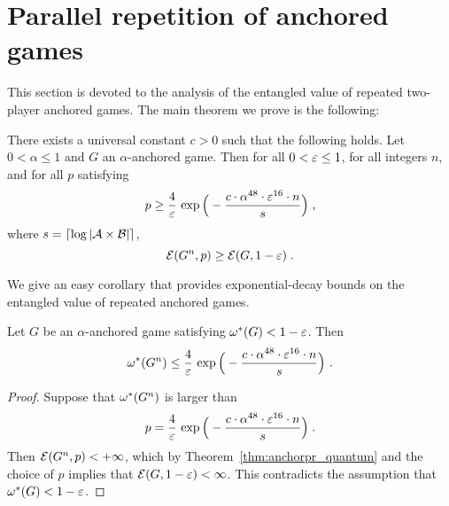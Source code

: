 
\section{Parallel repetition of anchored games}
\label{sec:analysis}

This section is devoted to the analysis of the entangled value of repeated two-player anchored games. The main theorem we prove is the following:


\begin{theorem}\label{thm:anchorpr_quantum}
	There exists a universal constant $c > 0$ such that the following holds. Let $0<\alpha\leq 1$ and $G$ an $\alpha$-anchored game. Then for all $0 < \varepsilon \leq 1$,
for all integers $n$, and for all $p$ satisfying
\begin{equation}
\label{eq:p}
p \geq \frac{4}{\varepsilon} \, \exp \Big ( - \frac{c \cdot \alpha^{48} \cdot \varepsilon^{16} \cdot n}{s} \Big)\;,
\end{equation}
where  $s =\lceil \log |\mathcal{A} \times \mathcal{B}|\rceil$, 
\[
	\mathcal{E}(G^n,p) \geq \mathcal{E}(G,1 - \varepsilon)\;.
\]
\end{theorem}

We give an easy corollary that provides exponential-decay bounds on the entangled value of repeated anchored games.

\begin{corollary}
Let $G$ be an $\alpha$-anchored game satisfying $\omega^*(G) < 1-\varepsilon$. Then
	$$ \omega^*(G^n)\leq \frac{4}{\varepsilon} \, \exp \Big ( - \frac{c \cdot \alpha^{48} \cdot \varepsilon^{16} \cdot n}{s} \Big)~.$$
\end{corollary}
\begin{proof}
	 Suppose that $\omega^*(G^n)$ is larger than 
	\[p = \frac{4}{\varepsilon} \, \exp \Big ( - \frac{c \cdot \alpha^{48} \cdot \varepsilon^{16} \cdot n}{s} \Big)\;.\]
	Then $\mathcal{E}(G^n,p) < +\infty$, which by Theorem~\ref{thm:anchorpr_quantum} and the choice of $p$ implies that $\mathcal{E}(G,1 - \varepsilon) < \infty$. This contradicts the assumption that $\omega^*(G) < 1 - \varepsilon$.
\end{proof}

